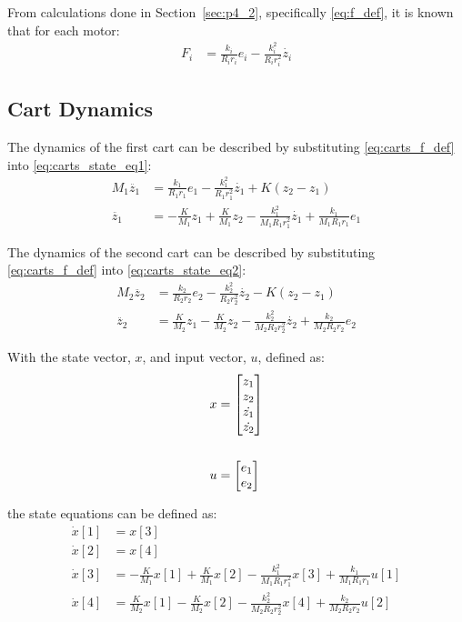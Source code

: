 \documentclass[]{article}
\newcommand{\sectionname}{Section}
\begin{document}
		From calculations done in \sectionname \ \ref{sec:p4_2}, specifically \eqref{eq:f_def}, it is known that for each motor:
		\begin{align}
			F_i &= \frac{k_i}{R_i r_i} e_i - \frac{k_i^2}{R_i r_i^2} \dot{z_i} \label{eq:carts_f_def}
		\end{align}

		
	\subsection{Cart Dynamics}
		The dynamics of the first cart can be described by substituting \eqref{eq:carts_f_def} into \eqref{eq:carts_state_eq1}:
		\begin{align}
			M_1 \ddot{z_1} &= \frac{k_1}{R_1 r_1} e_1 - \frac{k_1^2}{R_1 r_1^2} \dot{z_1} + K(z_2 - z_1) \nonumber\\
			\ddot{z_1} &= -\frac{K}{M_1} z_1 + \frac{K}{M_1} z_2 - \frac{k_1^2}{M_1 R_1 r_1^2} \dot{z_1} + \frac{k_1}{M_1 R_1 r_1} e_1
		\end{align}
	
		The dynamics of the second cart can be described by substituting \eqref{eq:carts_f_def} into \eqref{eq:carts_state_eq2}:
		\begin{align}
			M_2 \ddot{z_2} &= \frac{k_2}{R_2 r_2} e_2 - \frac{k_2^2}{R_2 r_2^2} \dot{z_2} - K(z_2 - z_1) \nonumber\\
			\ddot{z_2} &= \frac{K}{M_2} z_1 - \frac{K}{M_2} z_2 - \frac{k_2^2}{M_2 R_2 r_2^2} \dot{z_2} + \frac{k_2}{M_2 R_2 r_2} e_2
		\end{align}
	
		With the state vector, $x$, and input vector, $u$, defined as:
		\begin{align}
			x &= \mqty[z_1\\ z_2\\ \dot{z_1}\\ \dot{z_2}] \label{eq:carts_x_def}\\
			\nonumber\\
			u &= \mqty[e_1\\ e_2] \label{eq:carts_u_def}
		\end{align}
		
		the state equations can be defined as:
		\begin{equation}\label{eq:carts_state_eqs}
			\begin{aligned}
				\dot{x}[1] &= x[3]\\
				\dot{x}[2] &= x[4]\\
				\dot{x}[3] &= -\frac{K}{M_1} x[1] + \frac{K}{M_1} x[2] - \frac{k_1^2}{M_1 R_1 r_1^2} x[3] + \frac{k_1}{M_1 R_1 r_1} u[1]\\
				\dot{x}[4] &= \frac{K}{M_2} x[1] - \frac{K}{M_2} x[2] - \frac{k_2^2}{M_2 R_2 r_2^2} x[4] + \frac{k_2}{M_2 R_2 r_2} u[2]
			\end{aligned}
		\end{equation}
\end{document}
